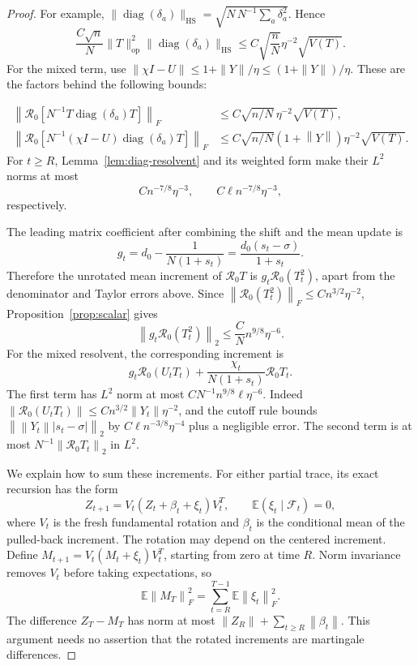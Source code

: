 \documentclass[11pt]{article}
\theoremstyle{definition}\newtheorem{definition}[theorem]{Definition}
\theoremstyle{remark}\newtheorem{remark}[theorem]{Remark}
\newcommand{\E}{\mathbb E}
\newcommand{\R}{\mathcal R}
\newcommand{\op}{\mathrm{op}}
\newcommand{\HS}{\mathrm{HS}}
\newcommand{\norm}[1]{\left\lVert#1\right\rVert}
\begin{document}
\begin{proof}
For example, $\|\operatorname{diag}(\delta_a)\|_{\HS}=\sqrt{N\,N^{-1}\sum_a\delta_a^2}$. Hence
\[
 \frac{C\sqrt n}{N}\|T\|_{\op}^2
       \|\operatorname{diag}(\delta_a)\|_{\HS}
 \le C\sqrt{\frac nN}\eta^{-2}\sqrt{V(T)}.
\]
For the mixed term, use $\|\chi I-U\|\le1+\|Y\|/\eta\le(1+\|Y\|)/\eta$. These are the factors behind the following bounds:

\begin{align}
 \left\|\R_0\left[N^{-1}T\operatorname{diag}(\delta_a)T\right]\right\|_F
 &\le C\sqrt{n/N}\,\eta^{-2}\sqrt{V(T)},\label{eq:den-T}\\
 \left\|\R_0\left[N^{-1}(\chi I-U)\operatorname{diag}(\delta_a)T\right]\right\|_F
 &\le C\sqrt{n/N}(1+\norm Y)\eta^{-2}\sqrt{V(T)}.
 \label{eq:den-U}
\end{align}
For $t\ge R$, Lemma~\ref{lem:diag-resolvent} and its weighted form make their $L^2$ norms at most
\begin{equation}\label{eq:den-L2}
 Cn^{-7/8}\eta^{-3},\qquad C\ell n^{-7/8}\eta^{-3},
\end{equation}
respectively.

The leading matrix coefficient after combining the shift and the mean update is
\begin{equation}\label{eq:gcoef}
 g_t=d_0-\frac1{N(1+s_t)}
     =\frac{d_0(s_t-\sigma)}{1+s_t}.
\end{equation}
Therefore the unrotated mean increment of $\R_0T$ is
$g_t\R_0(T_t^2)$, apart from the denominator and Taylor errors above. Since
$\norm{\R_0(T_t^2)}_F\le Cn^{3/2}\eta^{-2}$,
Proposition~\ref{prop:scalar} gives
\begin{equation}\label{eq:leading-T}
 \norm{g_t\R_0(T_t^2)}_2
 \le \frac C N n^{9/8}\eta^{-6}.
\end{equation}
For the mixed resolvent, the corresponding increment is
\begin{equation}\label{eq:leading-U-form}
 g_t\R_0(U_tT_t)+\frac{\chi_t}{N(1+s_t)}\R_0T_t.
\end{equation}
The first term has $L^2$ norm at most
$C N^{-1}n^{9/8}\ell\eta^{-6}$.
Indeed $\norm{\R_0(U_tT_t)}\le Cn^{3/2}\norm{Y_t}\eta^{-2}$, and the cutoff rule bounds
$\norm{\norm{Y_t}|s_t-\sigma|}_2$ by
$C\ell n^{-3/8}\eta^{-4}$ plus a negligible error.
The second term is at most $N^{-1}\norm{\R_0T_t}_2$ in $L^2$.

We explain how to sum these increments. For either partial trace, its exact recursion has the form
\[
 Z_{t+1}=V_t(Z_t+\beta_t+\xi_t)V_t^T,
 \qquad \E(\xi_t\mid\mathcal F_t)=0,
\]
where $V_t$ is the fresh fundamental rotation and $\beta_t$ is the conditional mean of the pulled-back increment. The rotation may depend on the centered increment. Define
$M_{t+1}=V_t(M_t+\xi_t)V_t^T$, starting from zero at time $R$. Norm invariance removes $V_t$ before taking expectations, so
\[
 \E\norm{M_T}_F^2=\sum_{t=R}^{T-1}\E\norm{\xi_t}_F^2.
\]
The difference $Z_T-M_T$ has norm at most
$\norm{Z_R}+\sum_{t\ge R}\norm{\beta_t}$.
This argument needs no assertion that the rotated increments are martingale differences.


\end{proof}
\end{document}
